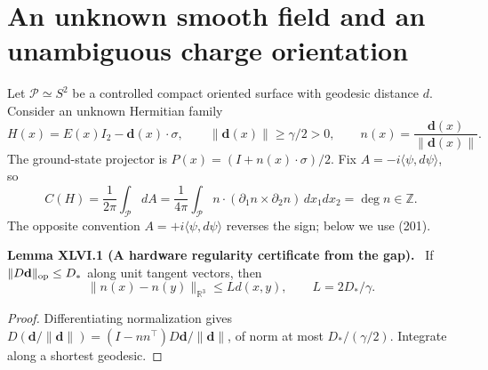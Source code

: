\documentclass[11pt,a4paper,oneside]{book}
\newcommand{\R}{\mathbb R}\newcommand{\C}{\mathbb C}\newcommand{\Z}{\mathbb Z}\newcommand{\N}{\mathbb N}\newcommand{\Q}{\mathbb Q}
\newcommand{\statement}[3]{\par\medskip\noindent\textbf{#1 #2 (#3).}\ }
\begin{document}
\section{An unknown smooth field and an unambiguous charge orientation}
Let $\mathcal P\simeq S^2$ be a controlled compact oriented surface with geodesic distance $d$. Consider an unknown Hermitian family
\begin{equation}H(x)=E(x)I_2-\mathbf d(x)\cdot\sigma,\qquad\|\mathbf d(x)\|\ge\gamma/2>0,\qquad n(x)=\frac{\mathbf d(x)}{\|\mathbf d(x)\|}.\tag{200}\end{equation}
The ground-state projector is $P(x)=(I+n(x)\cdot\sigma)/2$. Fix $A=-i\langle\psi,d\psi\rangle$, so
\begin{equation}C(H)=\frac1{2\pi}\int_{\mathcal P}dA=\frac1{4\pi}\int_{\mathcal P}n\cdot(\partial_1n\times\partial_2n)\,dx_1dx_2=\deg n\in\Z.\tag{201}\end{equation}
The opposite convention $A=+i\langle\psi,d\psi\rangle$ reverses the sign; below we use (201).
\statement{Lemma}{XLVI.1}{A hardware regularity certificate from the gap}
If $\|D\mathbf d\|_{\rm op}\le D_*$ along unit tangent vectors, then
\begin{equation}\|n(x)-n(y)\|_{\R^3}\le Ld(x,y),\qquad L=2D_*/\gamma.\tag{202}\end{equation}
\begin{proof}
Differentiating normalization gives $D(\mathbf d/\|\mathbf d\|)=(I-nn^\top)D\mathbf d/\|\mathbf d\|$, of norm at most $D_*/(\gamma/2)$. Integrate along a shortest geodesic.
\end{proof}
\end{document}
